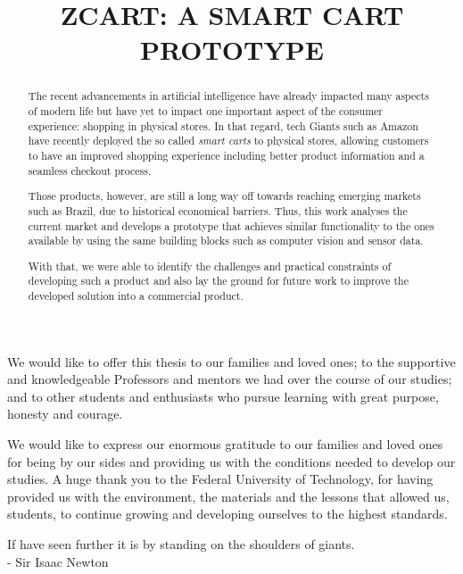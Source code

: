 \documentclass[openright]{normas-utf-tex} %
\title{\MakeUppercase{zCart: A smart cart prototype}} %
\begin{document}
\capa %
\folhaderosto %

\begin{dedicatoria}
We would like to offer this thesis to our families and loved ones;
to the supportive and knowledgeable Professors and mentors we had
over the course of our studies; and to other students and enthusiasts
who pursue learning with great purpose, honesty and courage.
\end{dedicatoria}

\begin{agradecimentos}
We would like to express our enormous gratitude to our families and loved ones 
for being by our sides and providing us with the conditions needed to develop our studies.
A huge thank you to the Federal University of Technology, for having
provided us with the environment, the materials and the lessons	that allowed us,
students, to continue growing and developing ourselves to the highest standards.
\end{agradecimentos}

\begin{epigrafe}
 If have seen further it is by standing on the shoulders of giants.  \\
- Sir Isaac Newton
\end{epigrafe}

\begin{abstract}
The recent advancements in artificial intelligence have already impacted many
aspects of modern life but have yet to impact one important aspect of the
consumer experience: shopping in physical stores. In that regard, tech
Giants such as Amazon have recently deployed the so called \textit{smart
carts} to physical stores, allowing customers to have an improved shopping
experience including better product information and a seamless checkout
process.

Those products, however, are still a long way off towards reaching emerging
markets such as Brazil, due to historical economical barriers. Thus, 
this work analyses the current market and develops a prototype that
achieves similar functionality to the ones available by using the same
building blocks such as computer vision and sensor data.

With that, we were able to identify the challenges and practical constraints
of developing such a product and also lay the ground for future work to improve
the developed solution into a commercial product.
\end{abstract}
\end{document}

